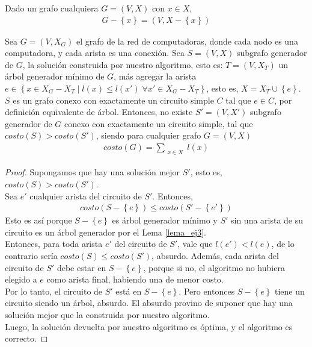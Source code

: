 \begin{notacion}
Dado un grafo cualquiera $G = (V,X)$ con $x \in X$, 
\begin{align*}
G - \left\{x\right\} = (V, X - \left\{x\right\})
\end{align*}
\end{notacion}

\begin{correctitud}
Sea $G = (V,X_G)$ el grafo de la red de computadoras, donde cada nodo es una computadora, y cada arista es una conexión. Sea $S = (V,X)$ subgrafo generador de $G$, la solución construida por nuestro algoritmo, esto es: $T = (V, X_T)$ un árbol generador mínimo de $G$, más agregar la arista $e \in \left\{x \in X_G - X_T \mid l(x) \leq l(x') \; \forall x' \in X_G - X_T \right\}$, esto es, $X = X_T \cup \left\{e\right\}$. $S$ es un grafo conexo con exactamente un circuito simple $C$ tal que $e \in C$, por definición equivalente de árbol. Entonces, no existe $S' = (V,X')$ subgrafo generador de $G$ conexo con exactamente un circuito simple, tal que $costo(S) > costo(S')$, siendo para cualquier grafo $G = (V,X)$
\begin{align*}
costo(G) = \sum\limits_{\substack{x \in X}} l(x)
\end{align*}
\end{correctitud}
\begin{proof}
Supongamos que hay una solución mejor $S'$, esto es, $costo(S) > costo(S')$. \\
\noindent Sea $e'$ cualquier arista del circuito de $S'$. Entonces,
\begin{align*}
costo(S - \left\{e\right\}) \leq costo(S' - \left\{e'\right\})
\end{align*}
Esto es así porque $S - \left\{e\right\}$ es árbol generador mínimo y $S'$ sin una arista de su circuito es un árbol generador por el Lema \ref{lema_ej3}. \\
Entonces, para toda arista $e'$ del circuito de $S'$, vale que $l(e') < l(e)$, de lo contrario sería $costo(S) \leq costo(S')$, absurdo.
Además, cada arista del circuito de $S'$ debe estar en $S - \left\{e\right\}$, porque si no, el algoritmo no hubiera elegido a $e$ como arista final, habiendo una de menor costo. \\
Por lo tanto, el circuito de $S'$ está en $S - \left\{e\right\}$. Pero entonces $S - \left\{e\right\}$ tiene un circuito siendo un árbol, absurdo. El absurdo provino de suponer que hay una solución mejor que la construida por nuestro algoritmo. \\
Luego, la solución devuelta por nuestro algoritmo es óptima, y el algoritmo es correcto.
\end{proof}

